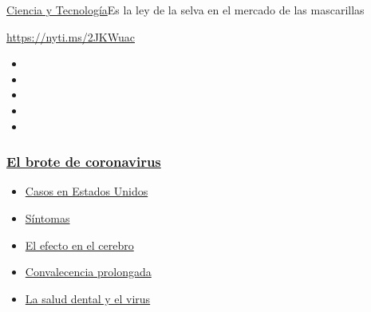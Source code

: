 \href{/es/section/ciencia-y-tecnologia}{Ciencia y
Tecnología}\textbar{}Es la ley de la selva en el mercado de las
mascarillas

\url{https://nyti.ms/2JKWuac}

\begin{itemize}
\item
\item
\item
\item
\item
\end{itemize}

\hypertarget{el-brote-de-coronavirus}{%
\subsubsection{\texorpdfstring{\href{https://www.nytimes3xbfgragh.onion/es/spotlight/coronavirus?name=styln-coronavirus-es\&region=TOP_BANNER\&block=storyline_menu_recirc\&action=click\&pgtype=Article\&impression_id=1d6307c0-f4c7-11ea-bca3-a182bcc486e2\&variant=undefined}{El
brote de
coronavirus}}{El brote de coronavirus}}\label{el-brote-de-coronavirus}}

\begin{itemize}
\tightlist
\item
  \href{https://www.nytimes3xbfgragh.onion/es/interactive/2020/espanol/mundo/coronavirus-en-estados-unidos.html?name=styln-coronavirus-es\&region=TOP_BANNER\&block=storyline_menu_recirc\&action=click\&pgtype=Article\&impression_id=1d6307c1-f4c7-11ea-bca3-a182bcc486e2\&variant=undefined}{Casos
  en Estados Unidos}
\item
  \href{https://www.nytimes3xbfgragh.onion/es/interactive/2020/08/06/espanol/ciencia-y-tecnologia/tengo-covid-19-sintomas.html?name=styln-coronavirus-es\&region=TOP_BANNER\&block=storyline_menu_recirc\&action=click\&pgtype=Article\&impression_id=1d632ed0-f4c7-11ea-bca3-a182bcc486e2\&variant=undefined}{Síntomas}
\item
  \href{https://www.nytimes3xbfgragh.onion/es/2020/09/11/espanol/ciencia-y-tecnologia/cerebro-coronavirus.html?name=styln-coronavirus-es\&region=TOP_BANNER\&block=storyline_menu_recirc\&action=click\&pgtype=Article\&impression_id=1d632ed1-f4c7-11ea-bca3-a182bcc486e2\&variant=undefined}{El
  efecto en el cerebro}
\item
  \href{https://www.nytimes3xbfgragh.onion/es/2020/09/09/espanol/ciencia-y-tecnologia/salud-mental-coronavirus.html?name=styln-coronavirus-es\&region=TOP_BANNER\&block=storyline_menu_recirc\&action=click\&pgtype=Article\&impression_id=1d632ed2-f4c7-11ea-bca3-a182bcc486e2\&variant=undefined}{Convalecencia
  prolongada}
\item
  \href{https://www.nytimes3xbfgragh.onion/es/2020/09/08/espanol/ciencia-y-tecnologia/dentistas-covid-dientes.html?name=styln-coronavirus-es\&region=TOP_BANNER\&block=storyline_menu_recirc\&action=click\&pgtype=Article\&impression_id=1d632ed3-f4c7-11ea-bca3-a182bcc486e2\&variant=undefined}{La
  salud dental y el virus}
\end{itemize}

